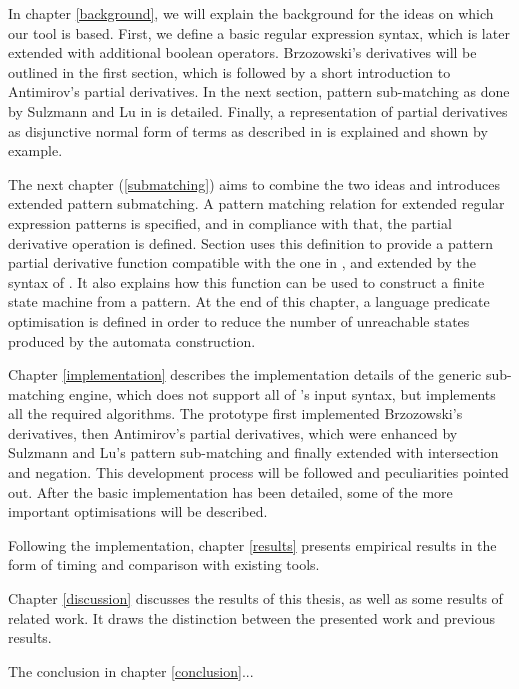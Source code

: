 In chapter \ref{background}, we will explain the background for the ideas on
which our tool is based. First, we define a basic regular expression syntax,
which is later extended with additional boolean operators. Brzozowski's
derivatives will be outlined in the first section, which is followed by a short
introduction to Antimirov's partial derivatives. In the next section, pattern
sub-matching as done by Sulzmann and Lu in \cite{pdpat} is detailed. Finally, a
representation of partial derivatives as disjunctive normal form of terms as
described in \cite{pdere} is explained and shown by example.

The next chapter (\ref{submatching}) aims to combine the two ideas and
introduces extended pattern submatching. A pattern matching relation for
extended regular expression patterns is specified, and in compliance with that,
the partial derivative operation is defined. Section \label{nfa} uses this
definition to provide a pattern partial derivative function compatible with the
one in \cite{pdpat}, and extended by the syntax of \cite{pdere}. It also
explains how this function can be used to construct a finite state machine from
a pattern. At the end of this chapter, a language predicate optimisation is
defined in order to reduce the number of unreachable states produced by the
automata construction.

Chapter \ref{implementation} describes the implementation details of the generic
sub-matching engine, which does not support all of \reml's input syntax, but
implements all the required algorithms. The prototype first implemented
Brzozowski's derivatives, then Antimirov's partial derivatives, which were
enhanced by Sulzmann and Lu's pattern sub-matching and finally extended with
intersection and negation. This development process will be followed and
peculiarities pointed out. After the basic implementation has been detailed,
some of the more important optimisations will be described.

Following the implementation, chapter \ref{results} presents empirical results
in the form of timing and comparison with existing tools.

Chapter \ref{discussion} discusses the results of this thesis, as well as some
results of related work. It draws the distinction between the presented work and
previous results.

The conclusion in chapter \ref{conclusion}...



